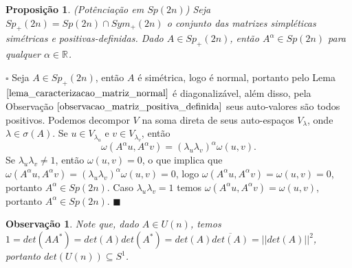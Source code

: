 \documentclass[12pt]{book}
\newtheorem{observacao}[teorema]{Observação}
\newtheorem{proposicao}[teorema]{Proposição}
\newenvironment{prova}[1]{$\square$ #1}{\hfill$\blacksquare$}
\newcommand{\espectrooperador}[1]{\sigma(#1)}
\newcommand{\gruposimpletico}[1]{Sp(#1)}
\newcommand{\gruposimpleticopositivo}[1]{Sp_{+}(#1)}
\newcommand{\matrizsimetricapositiva}[1]{Sym_{+}(#1)}
\newcommand{\matrizunitaria}[1]{U(#1)}
\newcommand{\real}[1]{\mathbb{R}^{#1}}
\begin{document}
	\begin{proposicao}\label{proposicao_potenciacao_grupo_simpletico}
		(Potênciação em $\gruposimpletico{2n}$) Seja $\gruposimpleticopositivo{2n} = \gruposimpletico{2n} \cap \matrizsimetricapositiva{2n}$ o conjunto das matrizes simpléticas simétricas e positivas-definidas. Dado $A \in \gruposimpleticopositivo{2n}$, então $A^{\alpha} \in \gruposimpletico{2n}$ para qualquer $\alpha \in \real{}$.
	\end{proposicao}
	\begin{prova}
		Seja $A \in \gruposimpleticopositivo{2n}$, então $A$ é simétrica, logo é normal, portanto pelo Lema $\ref{lema_caracterizacao_matriz_normal}$ é diagonalizável, além disso, pela Observação $\ref{observacao_matriz_positiva_definida}$ seus auto-valores são todos positivos. Podemos decompor $V$ na soma direta de seus auto-espaços $V_{\lambda}$, onde $\lambda \in \espectrooperador{A}$. Se $u \in V_{\lambda_{u}}$ e $v \in V_{\lambda_{v}}$, então
		$$
		\omega(A^{\alpha}u,A^{\alpha}v) = 		(\lambda_{u}\lambda_{v})^{\alpha}\omega(u,v).
		$$
		Se $\lambda_{u}\lambda_{v}\neq 1$, então $\omega(u,v)=0$, o que implica que $\omega(A^{\alpha}u,A^{\alpha}v)=(\lambda_{u}\lambda_{v})^{\alpha}\omega(u,v)=0$, logo $\omega(A^{\alpha}u,A^{\alpha}v) = \omega(u,v)=0$, portanto $A^{\alpha} \in \gruposimpletico{2n}$. Caso $\lambda_{u}\lambda_{v}=1$ temos $\omega(A^{\alpha}u,A^{\alpha}v) = \omega(u,v)$, portanto $A^{\alpha} \in \gruposimpletico{2n}$.
	\end{prova}
	
	\begin{observacao}\label{observacao_determinante_matriz_unitaria}
		Note que, dado $A \in \matrizunitaria{n}$, temos $1= det(AA^{*}) = det(A)det(A^{*}) = det(A)\overline{det(A)} = ||det(A)||^{2}$, portanto $det(\matrizunitaria{n}) \subseteq S^{1}$.
	\end{observacao}
	
\end{document}
